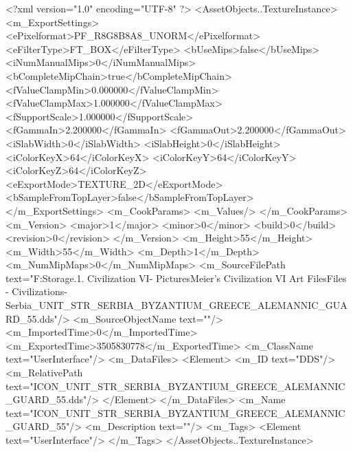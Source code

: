 <?xml version="1.0" encoding="UTF-8" ?>
<AssetObjects..TextureInstance>
	<m_ExportSettings>
		<ePixelformat>PF_R8G8B8A8_UNORM</ePixelformat>
		<eFilterType>FT_BOX</eFilterType>
		<bUseMips>false</bUseMips>
		<iNumManualMips>0</iNumManualMips>
		<bCompleteMipChain>true</bCompleteMipChain>
		<fValueClampMin>0.000000</fValueClampMin>
		<fValueClampMax>1.000000</fValueClampMax>
		<fSupportScale>1.000000</fSupportScale>
		<fGammaIn>2.200000</fGammaIn>
		<fGammaOut>2.200000</fGammaOut>
		<iSlabWidth>0</iSlabWidth>
		<iSlabHeight>0</iSlabHeight>
		<iColorKeyX>64</iColorKeyX>
		<iColorKeyY>64</iColorKeyY>
		<iColorKeyZ>64</iColorKeyZ>
		<eExportMode>TEXTURE_2D</eExportMode>
		<bSampleFromTopLayer>false</bSampleFromTopLayer>
	</m_ExportSettings>
	<m_CookParams>
		<m_Values/>
	</m_CookParams>
	<m_Version>
		<major>1</major>
		<minor>0</minor>
		<build>0</build>
		<revision>0</revision>
	</m_Version>
	<m_Height>55</m_Height>
	<m_Width>55</m_Width>
	<m_Depth>1</m_Depth>
	<m_NumMipMaps>0</m_NumMipMaps>
	<m_SourceFilePath text="F:\Mod Storage\2.1. Civilization VI\Mods\Archive - Pictures\Sid Meier's Civilization VI Art Files\Art Files - Civilizations\Civilization - Serbia\ICON_UNIT_STR_SERBIA_BYZANTIUM_GREECE_ALEMANNIC_GUARD_55.dds"/>
	<m_SourceObjectName text=""/>
	<m_ImportedTime>0</m_ImportedTime>
	<m_ExportedTime>3505830778</m_ExportedTime>
	<m_ClassName text="UserInterface"/>
	<m_DataFiles>
		<Element>
			<m_ID text="DDS"/>
			<m_RelativePath text="ICON_UNIT_STR_SERBIA_BYZANTIUM_GREECE_ALEMANNIC_GUARD_55.dds"/>
		</Element>
	</m_DataFiles>
	<m_Name text="ICON_UNIT_STR_SERBIA_BYZANTIUM_GREECE_ALEMANNIC_GUARD_55"/>
	<m_Description text=""/>
	<m_Tags>
		<Element text="UserInterface"/>
	</m_Tags>
</AssetObjects..TextureInstance>

